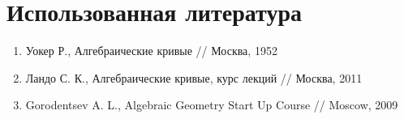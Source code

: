 \documentclass[a4paper, 12pt]{article}
\begin{document}
\begin{comment}
  1. Разложение результанта на билинейные множители. См. семинарский листок из соответствующей алгебры.
  2. Определение локальной кратности пересечения. ()
  3. Совпадение кратности пересечения вообще.
  4. Теорема о совпадении с кратностями множителей результанта.
  5. Оттуда немедленно сильная форма теоремы.
  6. И некоторым довольно длинным образом, полностью описанным у Уокера, соотношения Плюккера.
  _Только эти способом относительно легко перейти к соотношениям Плюккера, вероятно._

  Или

  1. Ввести инвариант непрерывных деформаций кривых - число пересечений с учётом кратностей. Та же ловкость рук.
  2. Кратность определить как число точек пересечения в случае, когда обе прямые вырождены. (соответственно нужно подробно описать класс деформаций.)
  3. Теорема Безу получается автоматически после того, как для каждой конкретной точки посчитается эта кратность. Странно и непонятно.

  Или

  1. Как у Ландо. Но чтобы удержать уровень строгости, нужно ввести много нового аппарата.

  Или

  1. Спрямить одну из кривых.
  2. Определить "число пересечений с учётом кратностей" так, чтобы оно было инвариантом диффеоморфизма. Проблема в особых точках.
  3. Рассмотреть случай на прямой. При этом вторая кривая получает степень mn через преобразование координат.

  Или

  1. Раздутие результанта в диагонали.

  Или

  1. Раздутие нашей плоскости в точках пересечения кривых. Кратность определяется по числу точек, в которые перешла данная. Это согласуется с произведением числа касательных, но намного строже.
  2. Записать раздутие уравнениями.
  3. Посчитать число всех точек на воткнутых прямых. Инвариантным способом на уравнениях.
\end{comment}

\section{Использованная литература}
\begin{enumerate}
  \item Уокер Р., Алгебраические кривые // Москва, 1952
  \item Ландо С. К., Алгебраические кривые, курс лекций // Москва, 2011
  \item Gorodentsev A. L., Algebraic Geometry Start Up Course // Moscow, 2009
\end{enumerate}
\end{document}
